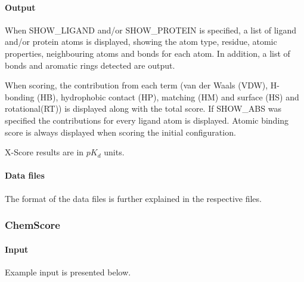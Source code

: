 \documentclass[a4paper,10pt]{article}
\begin{document}
  \paragraph{Output}
  When SHOW\_LIGAND and/or SHOW\_PROTEIN is specified, a list of ligand and/or protein atoms is displayed, showing the atom type, residue, atomic properties, neighbouring atoms and bonds for each atom. In  addition, a list of bonds and aromatic rings detected are output.

  When scoring, the contribution from each term (van der Waals (VDW), H-bonding (HB), hydrophobic contact (HP), matching (HM) and surface (HS) and rotational(RT)) is displayed along with the total score. If SHOW\_ABS was specified the contributions for every ligand atom is displayed.
  Atomic binding score is always displayed when scoring the initial configuration.

  X-Score results are in $pK_d$ units.

  \paragraph{Data files}
  The format of the data files is further explained in the respective files.


\subsubsection{ChemScore}

\paragraph{Input}
  Example input is presented below.
\end{document}
